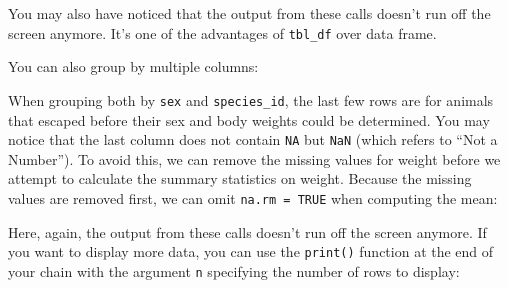 \documentclass[]{book}
\newenvironment{Shaded}{\begin{snugshade}}{\end{snugshade}}
\newcommand{\KeywordTok}[1]{\textcolor[rgb]{0.13,0.29,0.53}{\textbf{#1}}}
\newcommand{\DataTypeTok}[1]{\textcolor[rgb]{0.13,0.29,0.53}{#1}}
\newcommand{\StringTok}[1]{\textcolor[rgb]{0.31,0.60,0.02}{#1}}
\newcommand{\OtherTok}[1]{\textcolor[rgb]{0.56,0.35,0.01}{#1}}
\newcommand{\OperatorTok}[1]{\textcolor[rgb]{0.81,0.36,0.00}{\textbf{#1}}}
\newcommand{\NormalTok}[1]{#1}
\begin{document}
\begin{Shaded}
\end{Shaded}

You may also have noticed that the output from these calls doesn't run
off the screen anymore. It's one of the advantages of \texttt{tbl\_df}
over data frame.

You can also group by multiple columns:

\begin{Shaded}
\end{Shaded}

When grouping both by \texttt{sex} and \texttt{species\_id}, the last
few rows are for animals that escaped before their sex and body weights
could be determined. You may notice that the last column does not
contain \texttt{NA} but \texttt{NaN} (which refers to ``Not a Number'').
To avoid this, we can remove the missing values for weight before we
attempt to calculate the summary statistics on weight. Because the
missing values are removed first, we can omit \texttt{na.rm\ =\ TRUE}
when computing the mean:

\begin{Shaded}
\end{Shaded}

Here, again, the output from these calls doesn't run off the screen
anymore. If you want to display more data, you can use the
\texttt{print()} function at the end of your chain with the argument
\texttt{n} specifying the number of rows to display:
\end{document}
